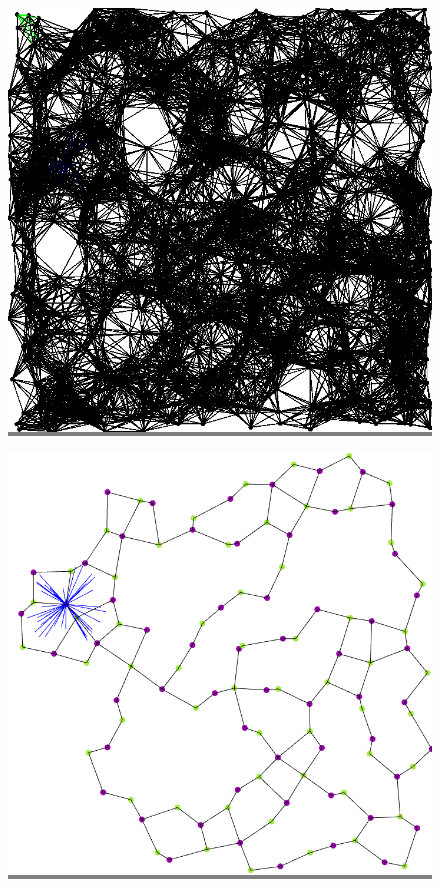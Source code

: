 \documentclass{article}
\begin{document}
\begin{figure}
    \begin{minipage}{0.3\textwidth}
    \colorbox{gray}{\includegraphics[width=\linewidth]{./images/square_0.png}}
    \end{minipage}
    \hspace{\fill}
    \begin{minipage}{0.3\textwidth}
    \colorbox{gray}{\includegraphics[width=\linewidth]{./images/square_0_bb_0.png}}

\end{minipage}
\end{figure}
\end{document}
